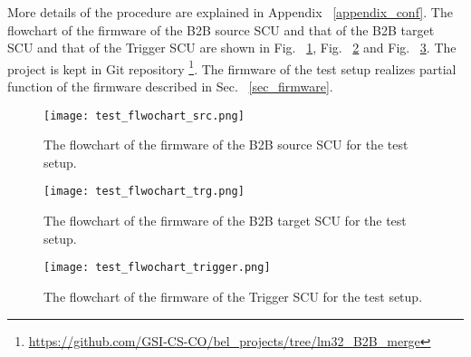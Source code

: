 More details of the procedure are explained in Appendix ~\ref{appendix_conf}. The flowchart of the firmware of the B2B source SCU and that of the B2B target SCU and that of the Trigger SCU are shown in Fig. ~\ref{test_flwochart}, Fig. ~\ref{test_flwochart1} and Fig. ~\ref{test_flwochart2}. The project is kept in Git repository \footnote{\url{https://github.com/GSI-CS-CO/bel_projects/tree/lm32_B2B_merge}}. The firmware of the test setup realizes partial function of the firmware described in Sec. ~\ref{sec_firmware}.
\begin{figure}[H]
   \centering   
   \texttt{[image: test\_flwochart\_src.png]}
   \caption{The flowchart of the firmware of the B2B source SCU for the test setup.}
   \label{test_flwochart}
\end{figure}
\begin{figure}[H]
   \centering   
   \texttt{[image: test\_flwochart\_trg.png]}
   \caption{The flowchart of the firmware of the B2B target SCU for the test setup.}
   \label{test_flwochart1}
\end{figure}
\begin{figure}[H]
   \centering   
   \texttt{[image: test\_flwochart\_trigger.png]}
   \caption{The flowchart of the firmware of the Trigger SCU for the test setup.}
   \label{test_flwochart2}
\end{figure}


